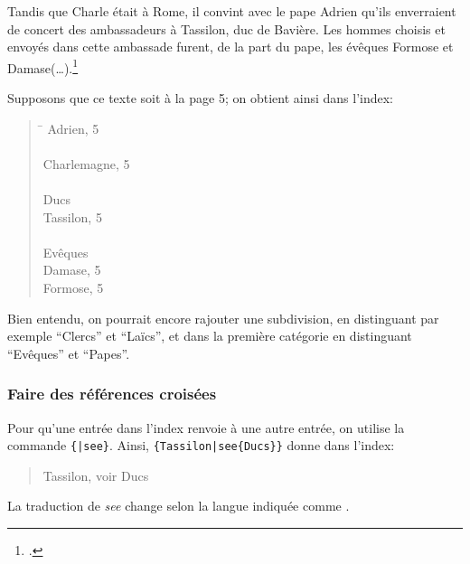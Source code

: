 \begin{bashcode}
\begin{latexcode}
Tandis que Charle était à Rome, il convint 
avec le pape Adrien qu’ils enverraient de concert 
des ambassadeurs à Tassilon, duc de Bavière.
Les hommes choisis et envoyés dans cette ambassade furent, de la 
part du pape, les évêques Formose
et Damase(…).\footcite{eginhard}

\end{latexcode}


Supposons que ce texte soit à la page 5; on obtient ainsi dans l'index:
\begin{quotation}
\begin{tabbing}
\hspace{0,5cm}  \= \kill
Adrien, 5 \\
\\
Charlemagne, 5 \\
\\
Ducs \\
\> Tassilon, 5\\
\\
Evêques \\
\> Damase, 5\\
\> Formose, 5\\

\end{tabbing}
\end{quotation}



Bien entendu, on pourrait encore rajouter une subdivision, en distinguant par exemple \enquote{Clercs} et \enquote{Laïcs}, et dans la première catégorie en distinguant \enquote{Evêques} et \enquote{Papes}. 


 
\subsubsection{Faire des références croisées}

Pour qu'une entrée dans l'index renvoie à une autre entrée, on utilise la commande  \verb|{|\verb+|see+\verb|}|. Ainsi,  \verb+{Tassilon|see{Ducs}}+ donne dans l'index:

\begin{quotation}
Tassilon, voir Ducs
\end{quotation}
La traduction de \emph{see} change selon la langue indiquée comme . 




\end{bashcode}
